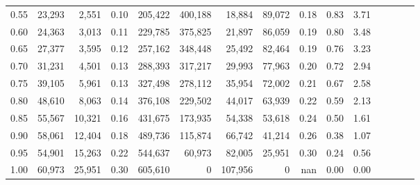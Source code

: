 \begin{tabular}{rrrcrrrrrrrrrrr}
0.55 &  23,293 &   2,551 &                                       0.10 &  205,422 &  400,188 &   18,884 &   89,072 &  0.18 &  0.83 &                         3.71 \\
0.60 &  24,363 &   3,013 &                                       0.11 &  229,785 &  375,825 &   21,897 &   86,059 &  0.19 &  0.80 &                         3.48 \\
0.65 &  27,377 &   3,595 &                                       0.12 &  257,162 &  348,448 &   25,492 &   82,464 &  0.19 &  0.76 &                         3.23 \\
0.70 &  31,231 &   4,501 &                                       0.13 &  288,393 &  317,217 &   29,993 &   77,963 &  0.20 &  0.72 &                         2.94 \\
0.75 &  39,105 &   5,961 &                                       0.13 &  327,498 &  278,112 &   35,954 &   72,002 &  0.21 &  0.67 &                         2.58 \\
0.80 &  48,610 &   8,063 &                                       0.14 &  376,108 &  229,502 &   44,017 &   63,939 &  0.22 &  0.59 &                         2.13 \\
0.85 &  55,567 &  10,321 &                                       0.16 &  431,675 &  173,935 &   54,338 &   53,618 &  0.24 &  0.50 &                         1.61 \\
0.90 &  58,061 &  12,404 &                                       0.18 &  489,736 &  115,874 &   66,742 &   41,214 &  0.26 &  0.38 &                         1.07 \\
0.95 &  54,901 &  15,263 &                                       0.22 &  544,637 &   60,973 &   82,005 &   25,951 &  0.30 &  0.24 &                         0.56 \\
1.00 &  60,973 &  25,951 &                                       0.30 &  605,610 &        0 &  107,956 &        0 &   nan &  0.00 &                         0.00 \\
\bottomrule
\end{tabular}
